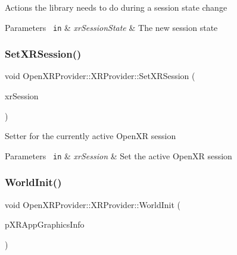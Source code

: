 Actions the library needs to do during a session state change 
\begin{DoxyParams}[1]{Parameters}
\mbox{\texttt{ in}}  & {\em xr\+Session\+State} & The new session state \\
\hline
\end{DoxyParams}
\mbox{\label{class_open_x_r_provider_1_1_x_r_provider_a96ffa9e4f37cc4967cf41fce027e5234}} 
\subsubsection{\texorpdfstring{SetXRSession()}{SetXRSession()}}
{\footnotesize\ttfamily void Open\+X\+R\+Provider\+::\+X\+R\+Provider\+::\+Set\+X\+R\+Session (\begin{DoxyParamCaption}\item[{Xr\+Session}]{xr\+Session }\end{DoxyParamCaption})\hspace{0.3cm}{\ttfamily [inline]}}

Setter for the currently active Open\+XR session 
\begin{DoxyParams}[1]{Parameters}
\mbox{\texttt{ in}}  & {\em xr\+Session} & Set the active Open\+XR session \\
\hline
\end{DoxyParams}
\mbox{\label{class_open_x_r_provider_1_1_x_r_provider_a381bae7b1021638036878cad1c0ea3c2}} 
\subsubsection{\texorpdfstring{WorldInit()}{WorldInit()}}
{\footnotesize\ttfamily void Open\+X\+R\+Provider\+::\+X\+R\+Provider\+::\+World\+Init (\begin{DoxyParamCaption}\item[{\mbox{\hyperlink{struct_open_x_r_provider_1_1_x_r_app_graphics_info}{X\+R\+App\+Graphics\+Info}} $\ast$}]{p\+X\+R\+App\+Graphics\+Info }\end{DoxyParamCaption})\hspace{0.3cm}{\ttfamily [private]}}

